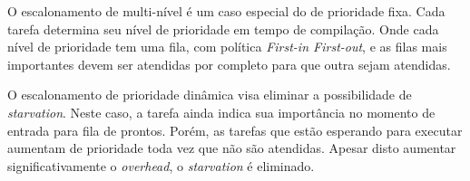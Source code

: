 O escalonamento de multi-nível é um caso especial do de prioridade fixa. 
Cada tarefa determina seu nível de prioridade em tempo de compilação. Onde cada nível de prioridade tem uma fila, com 
política \textit{First-in First-out}, e as filas mais importantes devem ser atendidas por completo para que outra sejam
atendidas.

O escalonamento de prioridade dinâmica visa eliminar a possibilidade de \textit{starvation}. Neste caso, a tarefa ainda
indica sua importância no momento de entrada para fila de prontos. Porém, as tarefas que estão esperando para executar
aumentam de prioridade toda vez que não são atendidas. Apesar disto aumentar significativamente o \textit{overhead}, o
\textit{starvation} é eliminado.

